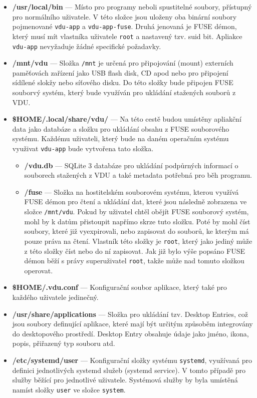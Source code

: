 \begin{itemize}
    \item \textbf{/usr/local/bin} — Místo pro programy neboli spustitelné soubory, přístupný pro normálního uživatele. V této složce jsou uloženy oba binární
    soubory pojmenované \texttt{vdu-app} a \texttt{vdu-app-fuse}. Druhá jenovaná je FUSE démon, který musí mít vlastníka uživatele \texttt{root} a nastavený
    tzv. suid bit. Apliakce \texttt{vdu-app} nevyžaduje žádné specifické požadavky.
    \item \textbf{/mnt/vdu} — Složka \texttt{/mnt} je určená pro připojování (mount) externích paměťovách zařízení jako USB flash disk, CD apod nebo pro připojení
    sídílené slokžy nebo síťového disku. Do této složky bude připojen FUSE souborvý systém, který bude využíván pro ukládání stažených souborů z VDU.
    \item \textbf{\$HOME/.local/share/vdu/} — Na této cestě budou umístěny apliakční data jako databáze a složku pro ukládání obsahu z FUSE souborového systému.
    Každému uživateli, který bude na daném operačním systému využivat \texttt{vdu-app} bude vytvořena tato složka.
    \begin{itemize}
        \item \textbf{/vdu.db} — SQLite 3 databáze pro ukládání podpůrných informací o souborech stažených z VDU a také metadata potřebná pro běh programu.
        \item \textbf{/fuse} — Složka na hostitelském souborovém systému, kterou využívá FUSE démon pro čtení a ukládání dat, které jsou následně zobrazena
        ve složce \texttt{/mnt/vdu}. Pokud by uživatel chtěl obějít FUSE souborový systém, mohl by k datům přistoupit napřímo skrze tuto složku. Poté by mohl
        číst soubory, které již vyexpirovali, nebo zapisovat do souborů, ke kterým má pouze práva na čtení. Vlastník této složky je \texttt{root}, který jako
        jediný může z této složky číst nebo do ní zapisovat. Jak již bylo výše popsáno FUSE démon běží s právy superuživatel \texttt{root}, takže může nad tomuto
        složkou operovat.
    \end{itemize}
    \item \textbf{\$HOME/.vdu.conf} — Konfigurační soubor aplikace, který také pro každého uživatele jedinečný.
    \item \textbf{/usr/share/applications} — Složka pro ukládání tzv. Desktop Entries, což jsou soubory definující aplikace, které mají být určitým způsoběm integrovány
    do desktopového prostředí. Desktop Entry obsahuje údaje jako jméno, ikona, popis, přiřazený typ souboru atd.
    \item \textbf{/etc/systemd/user} — Konfigurační složky systému \texttt{systemd}, využívaná pro definici jednotlivých systemd služeb (systemd service). V tomto 
    případě pro služby běžící pro jednotlivé uživatele. Systémová služby by byla umístěná namíst složky \texttt{user} ve složce \texttt{system}.
\end{itemize}

